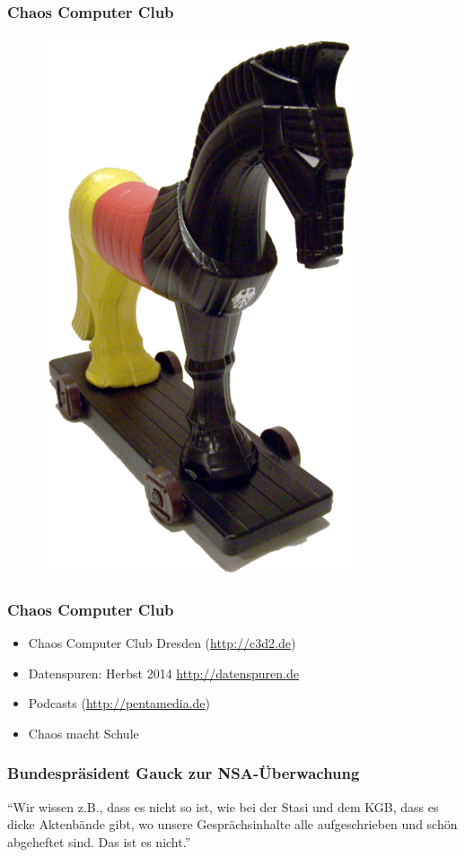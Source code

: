 \documentclass[12pt]{beamer}
\begin{document}
\begin{frame}
  \frametitle{Chaos Computer Club}
  \begin{figure}
    \includegraphics[height=0.7\textheight]{img/trojaner.png}
  \end{figure}
\end{frame}

\begin{frame}
    \frametitle{Chaos Computer Club}
    \begin{itemize}
      \item<1-> Chaos Computer Club Dresden (\url{http://c3d2.de})
          \note{}
      \item<2-> Datenspuren: Herbst 2014 \url{http://datenspuren.de}
      \item<3-> Podcasts (\url{http://pentamedia.de})
      \item<4-> Chaos macht Schule
    \end{itemize}
\end{frame}

\begin{frame}
    \frametitle{Bundespräsident Gauck zur NSA-Überwachung}
    \begin{center}
      "`Wir wissen z.B., dass es nicht so ist, wie bei der Stasi und dem KGB, dass es dicke Aktenbände gibt, wo unsere Gesprächsinhalte alle aufgeschrieben und schön abgeheftet sind. Das ist es nicht."'
      \end{center}
\end{frame}
\end{document}

